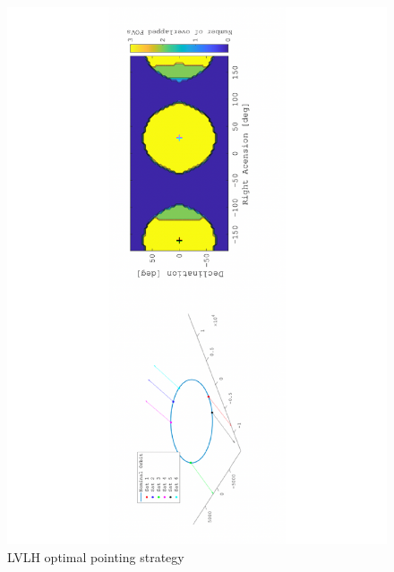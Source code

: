 \documentclass[]{spie}  %
\begin{document}
\begin{figure}[h!]
\centering
\includegraphics[scale=0.45,angle=-90]{pointying_strategy}
\vspace{-2.5cm}
\caption{LVLH optimal pointing strategy} 
\label{fig:strategy}
\end{figure}
\end{document}
